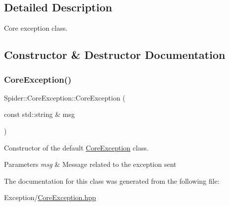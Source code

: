 \subsection{Detailed Description}
Core exception class. 

\subsection{Constructor \& Destructor Documentation}
\mbox{\label{class_spider_1_1_core_exception_a097cb8e36be15a4ee1527e7a32039da1}} 
\subsubsection{\texorpdfstring{Core\+Exception()}{CoreException()}}
{\footnotesize\ttfamily Spider\+::\+Core\+Exception\+::\+Core\+Exception (\begin{DoxyParamCaption}\item[{const std\+::string \&}]{msg }\end{DoxyParamCaption})\hspace{0.3cm}{\ttfamily [inline]}}



Constructor of the default \hyperlink{class_spider_1_1_core_exception}{Core\+Exception} class. 


\begin{DoxyParams}{Parameters}
{\em msg} & Message related to the exception sent \\
\hline
\end{DoxyParams}


The documentation for this class was generated from the following file\+:\begin{DoxyCompactItemize}
\item 
Exception/\hyperlink{_core_exception_8hpp}{Core\+Exception.\+hpp}\end{DoxyCompactItemize}
